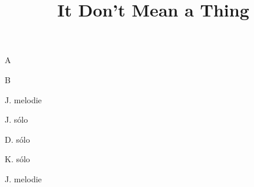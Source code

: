 \documentclass[timestamp]{jazzgrid}
\title{It Don't Mean a Thing}
\begin{document}
\maketitle
\begin{musicsection}{A}
\barline
	{}
	{}
	{}
	{}
\barline
	{}
	{}
	{}
	{}
	{}
\end{musicsection}
\begin{musicsection}{B}
\barline
	{}
	{}
	{}
	{\barfour{}{}{}{}{}}
\barline
	{}
	{}
	{}
	{}
\end{musicsection}

\begin{multicols*}{2}
\begin{description}[noitemsep,align=right,labelwidth=\widthof{\bfseries{\scriptsize 2$\times$AABA}}]
	\scriptsize
	\item [AABA] J. melodie
	\item [2$\times$AABA] J. sólo
	\item [2$\times$AABA] D. sólo
	\item [AA\phantom{BA}] K. sólo
	\item [\phantom{AA}BA] J. melodie
\end{description}

\end{multicols*}
\end{document}
